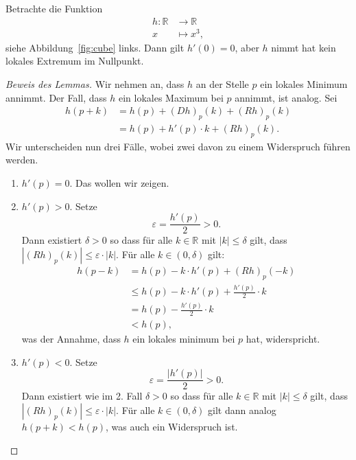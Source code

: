 \documentclass[../main.tex]{subfiles}
\begin{document}
\begin{example}
  Betrachte die Funktion
  \begin{align*}
    h \colon \mathbb{R} & \to \mathbb{R} \\
    x & \mapsto x^3,
  \end{align*}
  siehe Abbildung~\ref{fig:cube} links.
  Dann gilt $h'(0) = 0$, aber $h$
  nimmt hat kein lokales Extremum im Nullpunkt.
\end{example}

\begin{proof}[Beweis des Lemmas]
  Wir nehmen an, dass $h$ an der Stelle
  $p$ ein lokales Minimum annimmt. Der Fall,
  dass $h$ ein lokales Maximum bei $p$ annimmt,
  ist analog.
  Sei
  \begin{align*}
    h(p+k)
    & = h(p) + {(Dh)}_p(k) + {(Rh)}_p(k)\\
    & = h(p) + h'(p) \cdot k + {(Rh)}_p(k).
  \end{align*}
  Wir unterscheiden nun drei Fälle,
  wobei zwei davon zu einem Widerspruch führen werden.
  \begin{enumerate}[(1)]
    \item $h'(p) = 0$. Das wollen wir zeigen.
    \item $h'(p) > 0$. Setze
      \[
        \varepsilon = \frac{h'(p)}{2} > 0.
      \]
      Dann existiert $\delta > 0$ so dass
      für alle $k \in \mathbb{R}$ mit
      $|k| \leq \delta$ gilt, dass
      $|{(Rh)}_p(k)| \leq \varepsilon \cdot |k|$.
      Für alle $k \in (0, \delta)$ gilt:
      \begin{align*}
        h(p-k)
        &= h(p) - k \cdot h'(p) + {(Rh)}_p(-k)\\
        &\leq h(p) - k \cdot h'(p) + \frac{h'(p)}{2} \cdot k \\
        &= h(p) - \frac{h'(p)}{2} \cdot k \\
        &< h(p),
      \end{align*}
      was der Annahme, dass $h$ ein lokales minimum bei $p$
      hat, widerspricht.
    \item $h'(p) < 0$.
      Setze 
      \[
        \varepsilon = \frac{|h'(p)|}{2} > 0.
      \]
      Dann existiert wie im 2. Fall $\delta > 0$ so dass
      für alle $k \in \mathbb{R}$ mit
      $|k| \leq \delta$ gilt, dass
      $|{(Rh)}_p(k)| \leq \varepsilon \cdot |k|$.
      Für alle $k \in (0, \delta)$ gilt dann
      analog
      $h(p + k) < h(p)$, was auch ein Widerspruch ist. \qedhere
  \end{enumerate}
\end{proof}
\end{document}
